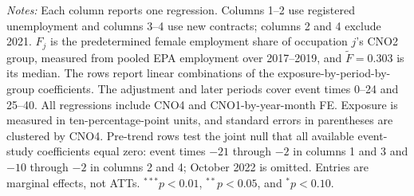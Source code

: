 \begin{table}[!htbp]
\begin{threeparttable}
\begin{tablenotes}[flushleft]
\item \emph{Notes:} Each column reports one regression. Columns 1--2 use registered unemployment and columns 3--4 use new contracts; columns 2 and 4 exclude 2021. $F_j$ is the predetermined female employment share of occupation $j$'s CNO2 group, measured from pooled EPA employment over 2017--2019, and $\widetilde F=0.303$ is its median. The rows report linear combinations of the exposure-by-period-by-group coefficients. The adjustment and later periods cover event times 0--24 and 25--40. All regressions include CNO4 and CNO1-by-year-month FE. Exposure is measured in ten-percentage-point units, and standard errors in parentheses are clustered by CNO4. Pre-trend rows test the joint null that all available event-study coefficients equal zero: event times $-21$ through $-2$ in columns 1 and 3 and $-10$ through $-2$ in columns 2 and 4; October 2022 is omitted. Entries are marginal effects, not ATTs. $^{***}p<0.01$, $^{**}p<0.05$, and $^{*}p<0.10$.
\end{tablenotes}
\end{threeparttable}
\end{table}
